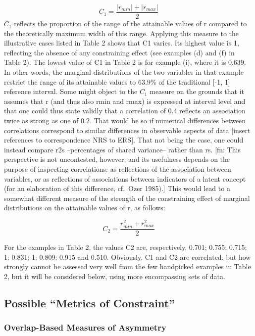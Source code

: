 \documentclass[
  12pt,
]{article}
\theoremstyle{plain}
\theoremstyle{definition}
\theoremstyle{remark}
\begin{document}
\[
C_1 = \frac{|r_{min}| +|r_{max}|}{2}
\] \(C_1\) reflects the proportion of the range of the attainable values
of r compared to the theoretically maximum width of this range. Applying
this measure to the illustrative cases listed in Table 2 shows that C1
varies. Its highest value is 1, reflecting the absence of any
constraining effect (see examples (d) and (f) in Table 2). The lowest
value of C1 in Table 2 is for example (i), where it is 0.639. In other
words, the marginal distributions of the two variables in that example
restrict the range of its attainable values to 63.9\% of the traditional
{[}-1, 1{]} reference interval. Some might object to the \(C_1\) measure
on the grounds that it assumes that r (and thus also rmin and rmax) is
expressed at interval level and that one could thus state validly that a
correlation of 0.4 reflects an association twice as strong as one of
0.2. That would be so if numerical differences between correlations
correspond to similar differences in observable aspects of data
{[}insert references to correspondence NRS to ERS{]}. That not being the
case, one could instead compare r2s --percentages of shared variance--
rather than rs. {[}fn: This perspective is not uncontested, however, and
its usefulness depends on the purpose of inspecting correlations: as
reflections of the association between variables, or as reflections of
associations between indicators of a latent concept (for an elaboration
of this difference, cf.~Ozer 1985).{]} This would lead to a somewhat
different measure of the strength of the constraining effect of marginal
distributions on the attainable values of r, as follows:

\[
C_2 = \frac{r_{min}^2 +r_{max}^2}{2}
\]

For the examples in Table 2, the values C2 are, respectively, 0.701;
0.755; 0.715; 1; 0.831; 1; 0.809; 0.915 and 0.510. Obviously, C1 and C2
are correlated, but how strongly cannot be assessed very well from the
few handpicked examples in Table 2, but it will be considered below,
using more encompassing sets of data.

\subsection{Possible ``Metrics of
Constraint''}\label{possible-metrics-of-constraint}

\subsubsection{Overlap-Based Measures of
Asymmetry}\label{overlap-based-measures-of-asymmetry}
\end{document}
